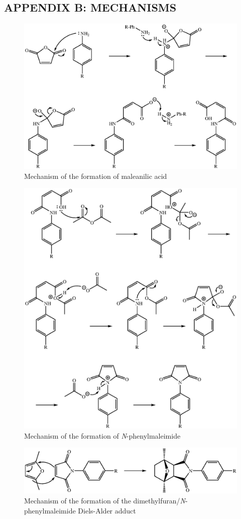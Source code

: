 \documentclass[11pt]{article}
\begin{document}
\newpage
\subsection*{APPENDIX B: MECHANISMS}

\begin{figure}[H]
    \centering
    \includegraphics[scale=0.8]{mechanisms/mechanism1.eps}
    \caption{Mechanism of the formation of maleanilic acid}
\end{figure}

\begin{figure}[H]
    \centering
    \includegraphics[scale=0.8]{mechanisms/mechanism2.eps}
    \caption{Mechanism of the formation of \textit{N}-phenylmaleimide}
\end{figure}

\begin{figure}[H]
    \centering
    \includegraphics[scale=0.8]{mechanisms/mechanism3.eps}
    \caption{Mechanism of the formation of the dimethylfuran/\textit{N}-phenylmaleimide Diels-Alder adduct}
\end{figure}
\end{document}
